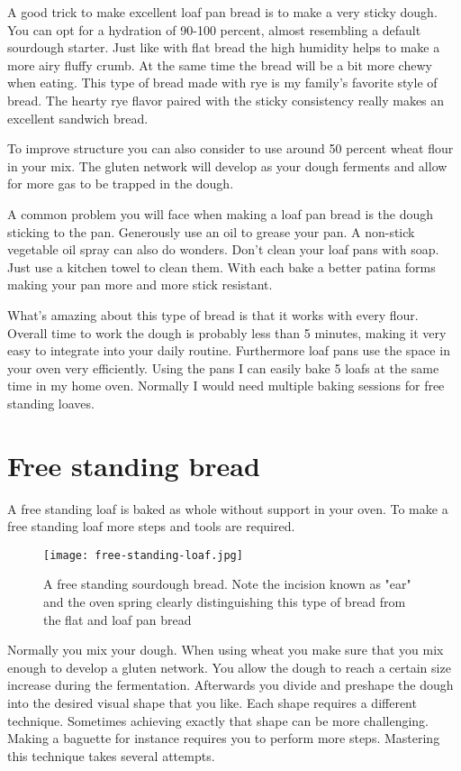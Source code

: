 A good trick to make excellent loaf pan bread is to make a very
sticky dough. You can opt for a hydration of 90-100 percent, almost
resembling a default sourdough starter. Just like with flat bread
the high humidity helps to make a more airy fluffy crumb. At
the same time the bread will be a bit more chewy when eating. This
type of bread made with rye is my family's favorite style of bread.
The hearty rye flavor paired with the sticky consistency really
makes an excellent sandwich bread.

To improve structure you can also consider to use around 50 percent
wheat flour in your mix. The gluten network will develop as your
dough ferments and allow for more gas to be trapped in the dough.

A common problem you will face when making a loaf pan bread is
the dough sticking to the pan. Generously use an oil to grease
your pan. A non-stick vegetable oil spray can also do wonders.
Don't clean your loaf pans with soap. Just use a kitchen towel
to clean them. With each bake a better patina forms making your
pan more and more stick resistant.

What's amazing about this type of bread is that it works
with every flour. Overall time to work the dough is probably
less than 5 minutes, making it very easy to integrate
into your daily routine. Furthermore loaf pans use the space
in your oven very efficiently. Using the pans I can
easily bake 5 loafs at the same time in my home oven.
Normally I would need multiple baking sessions for
free standing loaves.

\section{Free standing bread}

A free standing loaf is baked as whole without support
in your oven. To make a free standing loaf more steps
and tools are required.

\begin{figure}[!htb]
  \texttt{[image: free-standing-loaf.jpg]}
  \centering
  \caption{A free standing sourdough bread. Note the incision known as "ear" and the oven spring clearly
  distinguishing this type of bread from the flat and loaf pan bread}
\end{figure}

Normally you mix your dough. When using wheat you make sure
that you mix enough to develop a gluten network.
You allow the dough to reach
a certain size increase during the fermentation. Afterwards you divide and preshape
the dough into the desired visual shape that you like.
Each shape requires a different technique. Sometimes achieving
exactly that shape can be more challenging. Making a baguette
for instance requires you to perform more steps. Mastering this
technique takes several attempts.

